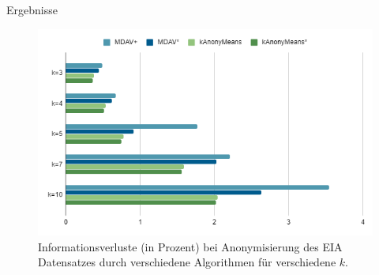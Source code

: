\documentclass[10pt,table]{beamer}
\begin{document}
\begin{frame}{Ergebnisse}
    \begin{figure}[H]
        \centering
        \includegraphics[scale=0.35]{Images/kAnonyMeansStarEIA.png}
        \caption{Informationsverluste (in Prozent) bei Anonymisierung des EIA Datensatzes durch verschiedene Algorithmen für verschiedene $k$.}
    \end{figure}
\end{frame}

\end{document}
